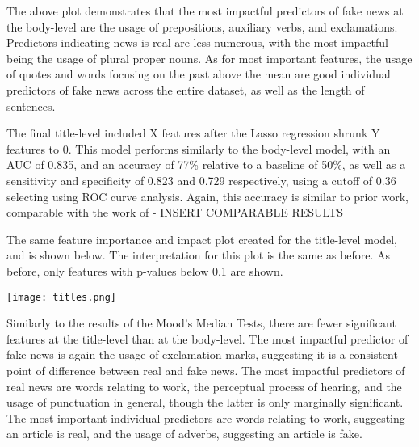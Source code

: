\documentclass[../thesis.tex]{subfiles}
\begin{document}
The above plot demonstrates that the most impactful predictors of fake news at the body-level are the usage of prepositions, auxiliary verbs, and exclamations.    Predictors indicating news is real are less numerous, with the most impactful being the usage of plural proper nouns. As for most important features, the usage of quotes and words focusing on the past above the mean are good individual predictors of fake news across the entire dataset, as well as the length of sentences.

The final title-level included X features after the Lasso regression shrunk Y features to 0. This model performs similarly to the body-level model, with an AUC of 0.835, and an accuracy of 77\% relative to a baseline of 50\%, as well as a sensitivity and specificity of 0.823 and 0.729 respectively, using a cutoff of 0.36 selecting using ROC curve analysis. Again, this accuracy is similar to prior work, comparable with the work of - INSERT COMPARABLE RESULTS

The same feature importance and impact plot created for the title-level model, and is shown below. The interpretation for this plot is the same as before. As before, only features  with p-values below 0.1 are shown.

\texttt{[image: titles.png]}

Similarly to the results of the Mood's Median Tests, there are fewer significant features at the title-level than at the body-level. The most impactful predictor of fake news is again the usage of exclamation marks, suggesting it is a consistent point of difference between real and fake news. The most impactful predictors of real news are words relating to work, the perceptual process of hearing, and the usage of punctuation in general, though the latter is only marginally significant. The most important individual predictors are words relating to work, suggesting an article is real, and the usage of adverbs, suggesting an article is fake.
\end{document}
